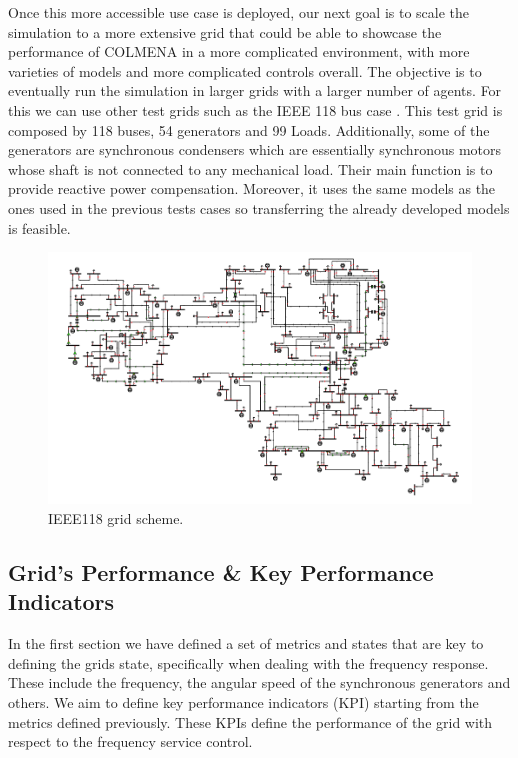 \documentclass{article}
\begin{document}
Once this more accessible use case is deployed, our next goal is to scale the simulation to a more extensive grid that could be able to showcase the performance of COLMENA in a more complicated environment, with more varieties of models and more complicated controls overall. The objective is to eventually run the simulation in larger grids with a larger number of agents. For this we can use other test grids such as the IEEE 118 bus case \cite{grids:ieee118}. This test grid is composed by 118 buses, 54 generators and 99 Loads. Additionally, some of the generators are synchronous condensers which are essentially synchronous motors whose shaft is not connected to any mechanical load. Their main function is to provide reactive power compensation. Moreover, it uses the same models as the ones used in the previous tests cases so transferring the already developed models is feasible.

\begin{figure}[h!]
    \centering
    \includegraphics[width=1\textwidth]{pictures/IEEE118.png}
    \caption{IEEE118 grid scheme. \cite{grids:ieee118}}
    \label{fig:kundur}
\end{figure}

\subsection{Grid's Performance \& Key Performance Indicators}\label{sec:KPI}

In the first section we have defined a set of metrics and states that are key to defining the grids state, specifically when dealing with the frequency response. These include the frequency, the angular speed of the synchronous generators and others. We aim to define key performance indicators (KPI) starting from the metrics defined previously. These KPIs define the performance of the grid with respect to the frequency service control. 
\end{document}

